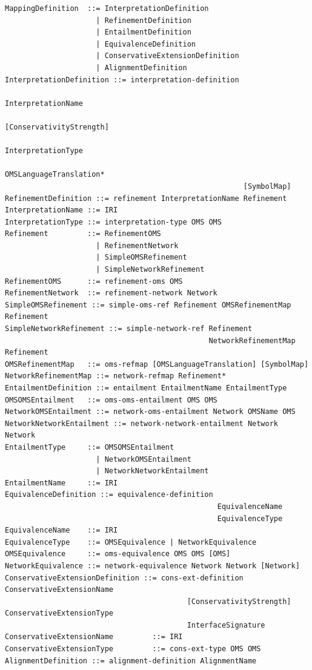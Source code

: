 \documentclass[10pt,fleqn,final]{scrreprt}
\newenvironment{definitions}[0]{\medskip }{}
\begin{document}
\begin{definitions}
\begin{lstlisting}[language=ebnf,escapeinside={<>},mathescape]
MappingDefinition  ::= InterpretationDefinition
                     | RefinementDefinition
                     | EntailmentDefinition
                     | EquivalenceDefinition
                     | ConservativeExtensionDefinition
                     | AlignmentDefinition
InterpretationDefinition ::= interpretation-definition
                                                       InterpretationName
                                                       [ConservativityStrength]
                                                       InterpretationType
                                                       OMSLanguageTranslation*
                                                       [SymbolMap]
RefinementDefinition ::= refinement InterpretationName Refinement
InterpretationName ::= IRI
InterpretationType ::= interpretation-type OMS OMS
Refinement         ::= RefinementOMS
                     | RefinementNetwork
                     | SimpleOMSRefinement
                     | SimpleNetworkRefinement
RefinementOMS      ::= refinement-oms OMS
RefinementNetwork  ::= refinement-network Network
SimpleOMSRefinement ::= simple-oms-ref Refinement OMSRefinementMap Refinement
SimpleNetworkRefinement ::= simple-network-ref Refinement
                                               NetworkRefinementMap Refinement
OMSRefinementMap   ::= oms-refmap [OMSLanguageTranslation] [SymbolMap]
NetworkRefinementMap ::= network-refmap Refinement*
EntailmentDefinition ::= entailment EntailmentName EntailmentType
OMSOMSEntailment   ::= oms-oms-entailment OMS OMS
NetworkOMSEntailment ::= network-oms-entailment Network OMSName OMS
NetworkNetworkEntailment ::= network-network-entailment Network Network
EntailmentType     ::= OMSOMSEntailment
                     | NetworkOMSEntailment
                     | NetworkNetworkEntailment
EntailmentName     ::= IRI
EquivalenceDefinition ::= equivalence-definition
                                                 EquivalenceName
                                                 EquivalenceType
EquivalenceName    ::= IRI
EquivalenceType    ::= OMSEquivalence | NetworkEquivalence
OMSEquivalence     ::= oms-equivalence OMS OMS [OMS]
NetworkEquivalence ::= network-equivalence Network Network [Network]
ConservativeExtensionDefinition ::= cons-ext-definition ConservativeExtensionName
                                          [ConservativityStrength] ConservativeExtensionType
                                          InterfaceSignature
ConservativeExtensionName         ::= IRI
ConservativeExtensionType         ::= cons-ext-type OMS OMS
AlignmentDefinition ::= alignment-definition AlignmentName

\end{lstlisting}
\end{definitions}
\end{document}
